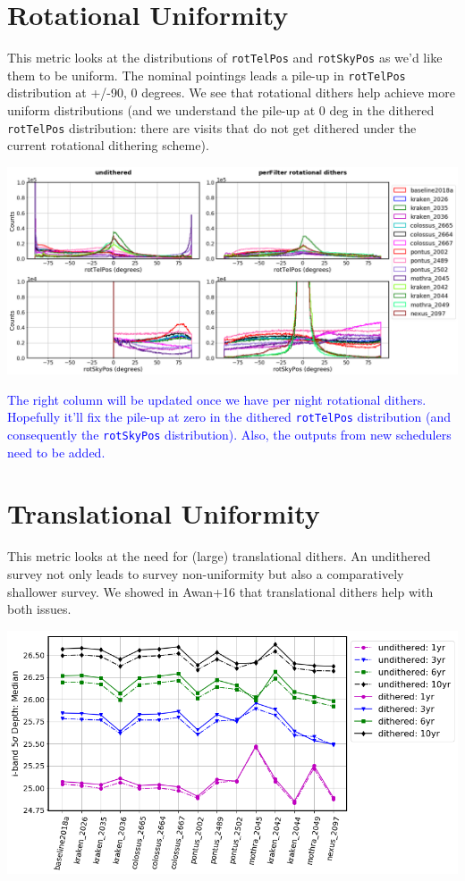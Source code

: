 \documentclass[a4paper,10pt]{article}
\newcommand{\ttt}[1]{\texttt{#1}}
\newcommand{\clB}[1]{\textcolor{blue}{#1}}
\begin{document}
\newpage
\section*{Rotational Uniformity\label{rotational dithers}}
This metric looks at the distributions of \ttt{rotTelPos} and \ttt{rotSkyPos} as we'd like them to be uniform. The nominal pointings leads a pile-up in \ttt{rotTelPos} distribution at +/-90, 0 degrees. We see that rotational dithers help achieve more uniform distributions (and we understand the pile-up at 0 deg in the dithered \ttt{rotTelPos} distribution: there are visits that do not get dithered under the current rotational dithering scheme).

\begin{minipage}{\columnwidth}
\centering
\includegraphics[width=\columnwidth]{lss_compare_rotDiths_15dbs.png}
\end{minipage}

\clB{The right column will be updated once we have per night rotational dithers. Hopefully it'll fix the pile-up at zero in the dithered \ttt{rotTelPos} distribution (and consequently the \ttt{rotSkyPos} distribution). Also, the outputs from new schedulers need to be added.}

\newpage
\section*{Translational Uniformity\label{translational dithers}}
This metric looks at the need for (large) translational dithers. An undithered survey not only leads to survey non-uniformity but also a comparatively shallower survey. We showed in Awan+16 that translational dithers help with both issues.

\begin{minipage}{\columnwidth}
\centering
\includegraphics[width=.75\columnwidth]{lss_compare_depth_median_15dbs_undith.png}
\end{minipage}
\end{document}
